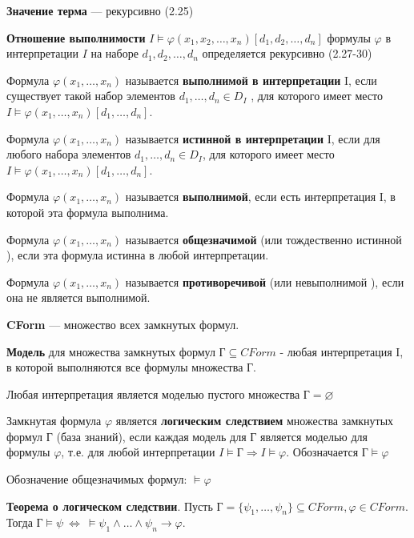 \documentclass[a4paper,12pt]{article}
\begin{document}
\textbf{Значение терма} --- рекурсивно (2.25)

\textbf{Отношение выполнимости} $I \models \varphi(x_1 , x_2 , \dots , x_n )[d_1 , d_2 , \dots , d_n ]$
формулы $\varphi$ в интерпретации $I$ на наборе $d_1 , d_2 , \dots , d_n $ определяется рекурсивно (2.27-30)



Формула $\varphi(x_1 , \dots, x_n )$ называется \textbf{выполнимой в интерпретации} I, если существует такой набор элементов $d_1 , \dots, d_n \in D_I$ , для которого имеет место $I \models \varphi(x_1 , \dots, x_n )[d_1 , \dots , d_n ]$.

Формула $\varphi(x_1 , \dots, x_n )$ называется \textbf{истинной в интерпретации} I, если для любого набора элементов $d_1 , \dots, d_n \in D_I$, для которого имеет место $I \models \varphi(x_1 , \dots, x_n )[d_1 , \dots , d_n ]$.

Формула $\varphi(x_1 , \dots, x_n )$ называется \textbf{выполнимой}, если есть интерпретация I, в которой эта формула выполнима.

Формула $\varphi(x_1 , \dots, x_n )$ называется \textbf{общезначимой} (или тождественно истинной ), если эта формула истинна в любой интерпретации.

Формула $\varphi(x_1 , \dots, x_n )$ называется \textbf{противоречивой} (или невыполнимой ), если она не является выполнимой.

\textbf{CForm} --- множество всех замкнутых формул.

\textbf{Модель} для множества замкнутых формул Г$ \subseteq CForm$ - любая интерпретация I, в которой выполняются все формулы множества Г.

Любая интерпретация является моделью пустого множества $\text{Г} = \varnothing$

Замкнутая формула $\varphi$ является \textbf{логическим следствием} множества замкнутых формул Г (база знаний), если каждая модель для Г является моделью для формулы $\varphi$, т.е. для любой интерпретации $I \models \text{Г} \Rightarrow I \models \varphi$. Обозначается $\text{Г} \models \varphi$

Обозначение общезначимых формул: $ \models \varphi$

\textbf{Теорема о логическом следствии}. Пусть Г$ = \{\psi_1 , \dots, \psi_n\} \subseteq CForm, \varphi \in CForm$. Тогда Г$ \models \psi ~ \Leftrightarrow ~ \models \psi_1 \wedge \dots \wedge \psi_n \rightarrow \varphi.$
\end{document}
